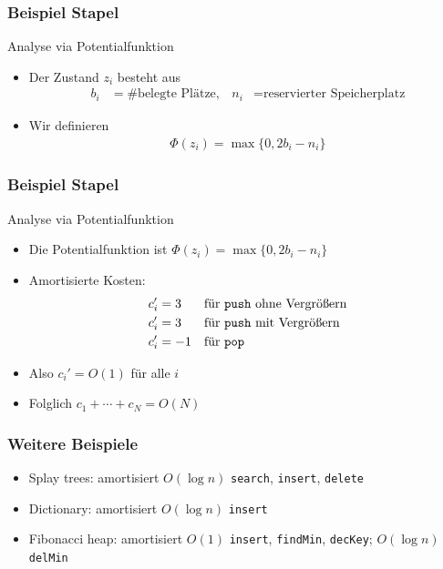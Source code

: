\documentclass[aspectratio=1610, 11pt]{beamer}
\begin{document}
\begin{frame}\frametitle{Beispiel Stapel}
	\begin{exampleblock}{Analyse via Potentialfunktion}
		\begin{itemize}
			\item Der Zustand $z_i$ besteht aus
				\begin{align*}
					b_i&=\#\mbox{belegte Pl\"atze},&n_i&=\mbox{reservierter Speicherplatz}
				\end{align*}
			\item Wir definieren
				\begin{align*}
					\Phi(z_i)=\max\{0,2b_i-n_i\}
				\end{align*}
		\end{itemize}
	\end{exampleblock}
\end{frame}

\begin{frame}\frametitle{Beispiel Stapel}
	\begin{exampleblock}{Analyse via Potentialfunktion}
		\begin{itemize}
			\item Die Potentialfunktion ist $\Phi(z_i)=\max\{0,2b_i-n_i\}$
			\item Amortisierte Kosten:
				\begin{align*}
					c_i'&=3&&\mbox{f\"ur {\tt push} ohne Vergr\"o\ss ern}\\
					c_i'&=3&&\mbox{f\"ur {\tt push} mit Vergr\"o\ss ern}\\
					c_i'&=-1&&\mbox{f\"ur {\tt pop}}
				\end{align*}
			\item Also $c_i'=O(1)$ f\"ur alle $i$
			\item Folglich $c_1+\cdots+c_N=O(N)$
		\end{itemize}
	\end{exampleblock}
\end{frame}

\begin{frame}\frametitle{Weitere Beispiele}
	\begin{itemize}
		\item \alert{Splay trees:} amortisiert $O(\log n)$ {\tt search}, {\tt insert}, {\tt delete}
		\item \alert{Dictionary:} amortisiert $O(\log n)$ {\tt insert}
		\item \alert{Fibonacci heap:} amortisiert $O(1)$ {\tt insert}, {\tt findMin}, {\tt decKey}; $O(\log n)$ {\tt delMin}
	\end{itemize}
\end{frame}
\end{document}
